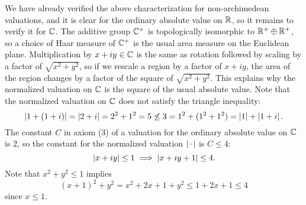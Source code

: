 We have already verified the above characterization for
non-archimedean valuations, and it is clear for the ordinary absolute
value on $\mathbb{R}$, so it remains to verify it for $\mathbb{C}$.  The additive
group $\mathbb{C}^+$ is topologically isomorphic to $\mathbb{R}^+ \oplus \mathbb{R}^+$, so a
choice of Haar measure of $\mathbb{C}^+$ is the usual area measure on the
Euclidean plane.  Multiplication by $x+iy\in \mathbb{C}$ is the same as
rotation followed by scaling by a factor of $\sqrt{x^2+y^2}$, so if we
rescale a region by a factor of $x+iy$, the area of the region changes
by a factor of the square of $\sqrt{x^2+y^2}$. This explains why the
normalized valuation on $\mathbb{C}$ is the square of the usual absolute
value.  Note that the normalized valuation on $\mathbb{C}$ does not satisfy
the triangle inequality:
$$
\left|1 + (1+i)\right| = \left|2+i\right| = 2^2 + 1^2 = 5 \not\leq 
 3= 1^2 + (1^2 + 1^2) =  \left|1\right| + \left|1+i\right|.
$$
The constant $C$ in axiom (3) of a valuation for the ordinary
absolute value on $\mathbb{C}$ is $2$, so the constant for the normalized
valuation $\left|\,\cdot\,\right|$ is $C\leq 4$:
$$
 \left|x+iy\right| \leq 1 \implies \left|x+iy+1\right| \leq 4.
$$
Note that $x^2 +y^2 \leq 1$ implies $$(x+1)^2 + y^2 
 = x^2 + 2x + 1 + y^2 \leq 1 + 2x + 1 \leq 4$$ since
$x\leq 1$.

